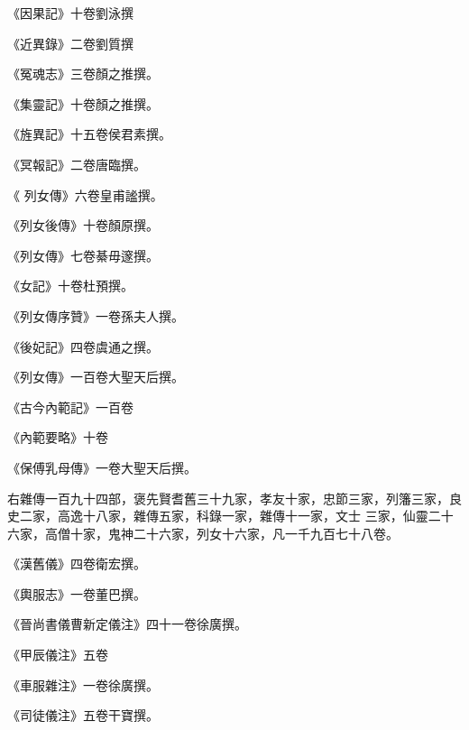\begin{pinyinscope}
 《因果記》十卷劉泳撰



 《近異錄》二卷劉質撰



 《冤魂志》三卷顏之推撰。



 《集靈記》十卷顏之推撰。



 《旌異記》十五卷侯君素撰。



 《冥報記》二卷唐臨撰。



 《
 列女傳》六卷皇甫謐撰。



 《列女後傳》十卷顏原撰。



 《列女傳》七卷綦毋邃撰。



 《女記》十卷杜預撰。



 《列女傳序贊》一卷孫夫人撰。



 《後妃記》四卷虞通之撰。



 《列女傳》一百卷大聖天后撰。



 《古今內範記》一百卷



 《內範要略》十卷



 《保傅乳母傳》一卷大聖天后撰。



 右雜傳一百九十四部，褒先賢耆舊三十九家，孝友十家，忠節三家，列籓三家，良史二家，高逸十八家，雜傳五家，科錄一家，雜傳十一家，文士
 三家，仙靈二十六家，高僧十家，鬼神二十六家，列女十六家，凡一千九百七十八卷。



 《漢舊儀》四卷衛宏撰。



 《輿服志》一卷董巴撰。



 《晉尚書儀曹新定儀注》四十一卷徐廣撰。



 《甲辰儀注》五卷



 《車服雜注》一卷徐廣撰。



 《司徒儀注》五卷干寶撰。




\end{pinyinscope}
